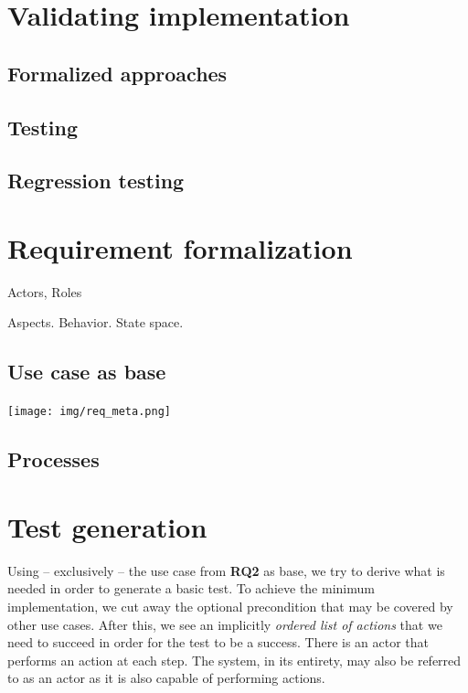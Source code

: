\documentclass[10pt]{scrreprt}
\begin{document}

\chapter{Validating implementation}

\section{Formalized approaches}
\section{Testing}

\section{Regression testing}

\chapter{Requirement formalization}
Actors, Roles

Aspects. Behavior. State space.

\section{Use case as base}
\texttt{[image: img/req\_meta.png]}

\section{Processes}

\chapter{Test generation}
Using -- exclusively -- the use case from \textbf{RQ2} as base, we try to derive what is needed in order to generate a basic test.
To achieve the minimum implementation, we cut away the optional precondition that may be covered by other use cases. After this, we see an implicitly \emph{ordered list of actions} that we need to succeed in order for the test to be a success. There is an actor that performs an action at each step. The system, in its entirety, may also be referred to as an actor as it is also capable of performing actions.
\end{document}
